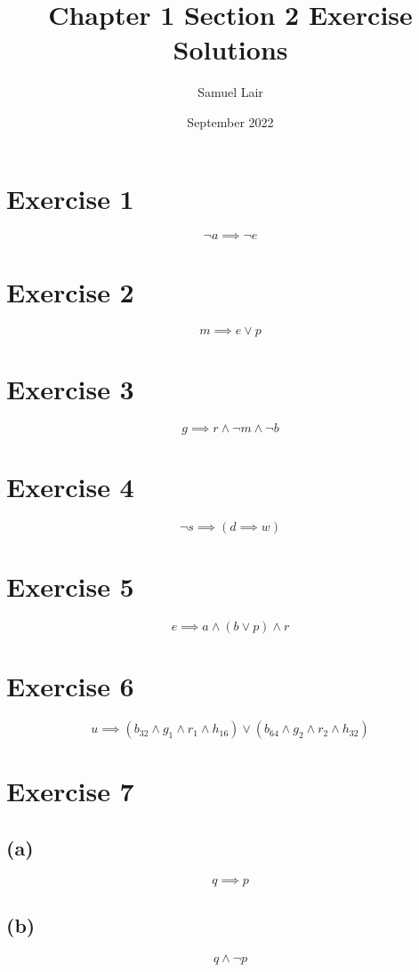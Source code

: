 \documentclass{article}
\title{Chapter 1 Section 2 Exercise Solutions}
\author{Samuel Lair}
\date{September 2022}
\begin{document}
\maketitle
\tableofcontents

\pagebreak

\section{Exercise 1}
\[
	\neg a \implies \neg e
\]

\pagebreak

\section{Exercise 2}
\[
	m \implies e \lor p
\]

\pagebreak

\section{Exercise 3}
\[
	g \implies r \land \neg m \land \neg b
\]

\pagebreak

\section{Exercise 4}
\[
	\neg s \implies (d \implies w)
\]

\pagebreak

\section{Exercise 5}
\[
	e \implies a \land (b \lor p) \land r
\]

\pagebreak

\section{Exercise 6}
\[
	u \implies (b_{32} \land g_1 \land r_1 \land h_{16}) \lor (b_{64} \land g_2 \land r_2 \land h_{32})
\]

\pagebreak

\section{Exercise 7}
\subsection{(a)}
\[
	q \implies p
\]
\subsection{(b)}
\[
	q \land \neg p
\]
\end{document}
